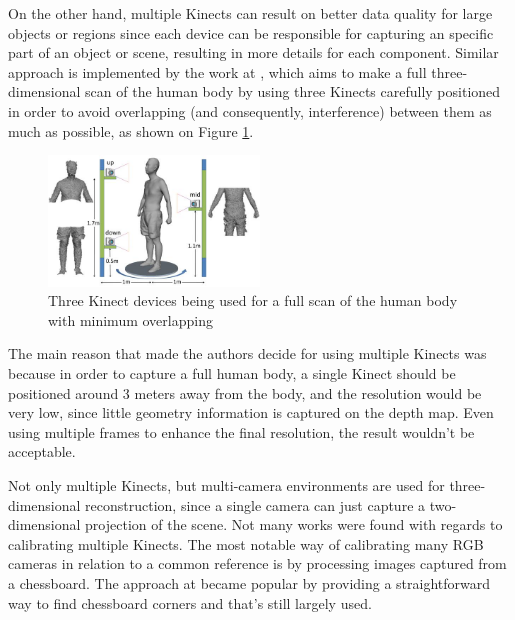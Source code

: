 \documentclass[msc, a4paper, classic, en]{ufbathesis}
\begin{document}
On the other hand, multiple Kinects can result on better data quality for large objects or regions since each device can be responsible for capturing an specific part of an object or scene, resulting in more details for each component. Similar approach is implemented by the work at \cite{tong}, which aims to make a full three-dimensional scan of the human body by using three Kinects carefully positioned in order to avoid overlapping (and consequently, interference) between them as much as possible, as shown on Figure \ref{fig:3kin}.

\begin{figure}
\centering
\includegraphics[width=0.5\textwidth]{images/3kin.jpg}
\caption{Three Kinect devices being used for a full scan of the human body with minimum overlapping \cite{tong}}
\label{fig:3kin}
\end{figure}

The main reason that made the authors decide for using multiple Kinects was because in order to capture a full human body, a single Kinect should be positioned around 3 meters away from the body, and the resolution would be very low, since little geometry information is captured on the depth map. Even using multiple frames to enhance the final resolution, the result wouldn't be acceptable.

Not only multiple Kinects, but multi-camera environments are used for three-dimensional reconstruction, since a single camera can just capture a two-dimensional projection of the scene. Not many works were found with regards to calibrating multiple Kinects. The most notable way of calibrating many RGB cameras in relation to a common reference is by processing images captured from a chessboard. The approach at \cite{matlab} became popular by providing a straightforward way to find chessboard corners and that's still largely used.
\end{document}
